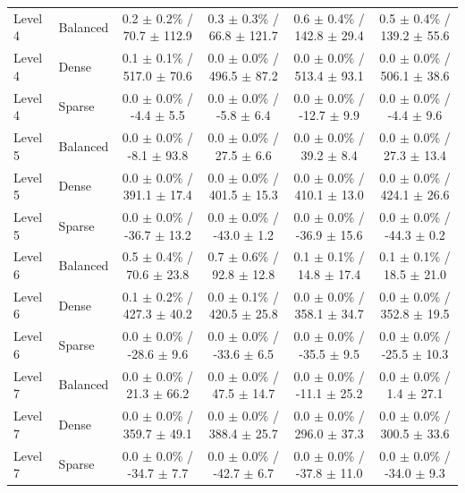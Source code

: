 \begin{table}[t]
{\begin{tabular}{llcccc}
\midrule
Level 4 & Balanced & 0.2 $\pm$ 0.2\% / 70.7 $\pm$ 112.9 & 0.3 $\pm$ 0.3\% / 66.8 $\pm$ 121.7 & 0.6 $\pm$ 0.4\% / 142.8 $\pm$ 29.4 & 0.5 $\pm$ 0.4\% / 139.2 $\pm$ 55.6 \\
Level 4 & Dense & 0.1 $\pm$ 0.1\% / 517.0 $\pm$ 70.6 & 0.0 $\pm$ 0.0\% / 496.5 $\pm$ 87.2 & 0.0 $\pm$ 0.0\% / 513.4 $\pm$ 93.1 & 0.0 $\pm$ 0.0\% / 506.1 $\pm$ 38.6 \\
Level 4 & Sparse & 0.0 $\pm$ 0.0\% / -4.4 $\pm$ 5.5 & 0.0 $\pm$ 0.0\% / -5.8 $\pm$ 6.4 & 0.0 $\pm$ 0.0\% / -12.7 $\pm$ 9.9 & 0.0 $\pm$ 0.0\% / -4.4 $\pm$ 9.6 \\
\midrule
Level 5 & Balanced & 0.0 $\pm$ 0.0\% / -8.1 $\pm$ 93.8 & 0.0 $\pm$ 0.0\% / 27.5 $\pm$ 6.6 & 0.0 $\pm$ 0.0\% / 39.2 $\pm$ 8.4 & 0.0 $\pm$ 0.0\% / 27.3 $\pm$ 13.4 \\
Level 5 & Dense & 0.0 $\pm$ 0.0\% / 391.1 $\pm$ 17.4 & 0.0 $\pm$ 0.0\% / 401.5 $\pm$ 15.3 & 0.0 $\pm$ 0.0\% / 410.1 $\pm$ 13.0 & 0.0 $\pm$ 0.0\% / 424.1 $\pm$ 26.6 \\
Level 5 & Sparse & 0.0 $\pm$ 0.0\% / -36.7 $\pm$ 13.2 & 0.0 $\pm$ 0.0\% / -43.0 $\pm$ 1.2 & 0.0 $\pm$ 0.0\% / -36.9 $\pm$ 15.6 & 0.0 $\pm$ 0.0\% / -44.3 $\pm$ 0.2 \\
\midrule
Level 6 & Balanced & 0.5 $\pm$ 0.4\% / 70.6 $\pm$ 23.8 & 0.7 $\pm$ 0.6\% / 92.8 $\pm$ 12.8 & 0.1 $\pm$ 0.1\% / 14.8 $\pm$ 17.4 & 0.1 $\pm$ 0.1\% / 18.5 $\pm$ 21.0 \\
Level 6 & Dense & 0.1 $\pm$ 0.2\% / 427.3 $\pm$ 40.2 & 0.0 $\pm$ 0.1\% / 420.5 $\pm$ 25.8 & 0.0 $\pm$ 0.0\% / 358.1 $\pm$ 34.7 & 0.0 $\pm$ 0.0\% / 352.8 $\pm$ 19.5 \\
Level 6 & Sparse & 0.0 $\pm$ 0.0\% / -28.6 $\pm$ 9.6 & 0.0 $\pm$ 0.0\% / -33.6 $\pm$ 6.5 & 0.0 $\pm$ 0.0\% / -35.5 $\pm$ 9.5 & 0.0 $\pm$ 0.0\% / -25.5 $\pm$ 10.3 \\
\midrule
Level 7 & Balanced & 0.0 $\pm$ 0.0\% / 21.3 $\pm$ 66.2 & 0.0 $\pm$ 0.0\% / 47.5 $\pm$ 14.7 & 0.0 $\pm$ 0.0\% / -11.1 $\pm$ 25.2 & 0.0 $\pm$ 0.0\% / 1.4 $\pm$ 27.1 \\
Level 7 & Dense & 0.0 $\pm$ 0.0\% / 359.7 $\pm$ 49.1 & 0.0 $\pm$ 0.0\% / 388.4 $\pm$ 25.7 & 0.0 $\pm$ 0.0\% / 296.0 $\pm$ 37.3 & 0.0 $\pm$ 0.0\% / 300.5 $\pm$ 33.6 \\
Level 7 & Sparse & 0.0 $\pm$ 0.0\% / -34.7 $\pm$ 7.7 & 0.0 $\pm$ 0.0\% / -42.7 $\pm$ 6.7 & 0.0 $\pm$ 0.0\% / -37.8 $\pm$ 11.0 & 0.0 $\pm$ 0.0\% / -34.0 $\pm$ 9.3 \\
\bottomrule
\end{tabular}%
}
\end{table}

